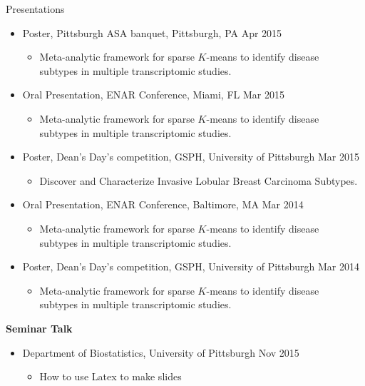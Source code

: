 \documentclass{resume} %
\begin{document}
\begin{rSection}{Presentations}
\begin{itemize}[noitemsep,topsep=0pt]
\item Poster, Pittsburgh ASA banquet, Pittsburgh, PA \hfill {Apr 2015}
\begin{itemize}[noitemsep,topsep=0pt]
\item{Meta-analytic framework for sparse $K$-means to identify disease\\ subtypes in multiple transcriptomic studies.}
\end{itemize}

\item Oral Presentation, ENAR Conference, Miami, FL \hfill {Mar 2015}
\begin{itemize}[noitemsep,topsep=0pt]
\item{Meta-analytic framework for sparse $K$-means to identify disease\\ subtypes in multiple transcriptomic studies.}
\end{itemize}

\item Poster, Dean's Day's competition, GSPH, University of Pittsburgh \hfill {Mar 2015}
\begin{itemize}[noitemsep,topsep=0pt]
\item{Discover and Characterize Invasive Lobular Breast Carcinoma Subtypes.}
\end{itemize}

\item Oral Presentation, ENAR Conference, Baltimore, MA \hfill {Mar 2014}
\begin{itemize}[noitemsep,topsep=0pt]
\item{Meta-analytic framework for sparse $K$-means to identify disease\\ subtypes in multiple transcriptomic studies.}
\end{itemize}

\item Poster, Dean's Day's competition, GSPH, University of Pittsburgh \hfill {Mar 2014}
\begin{itemize}[noitemsep,topsep=0pt]
\item{Meta-analytic framework for sparse $K$-means to identify disease \\ subtypes in multiple transcriptomic studies.}
\end{itemize}
\end{itemize}

\textbf{Seminar Talk}
\begin{itemize}[noitemsep,topsep=0pt]
\item Department of Biostatistics, University of Pittsburgh  \hfill Nov 2015
\begin{itemize}[noitemsep,topsep=0pt]
\item{How to use Latex to make slides}
\end{itemize}
\end{itemize}


\end{rSection}
\end{document}

